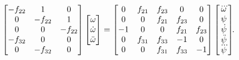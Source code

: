 \documentclass[12pt,a4paper,openany]{extarticle}
\begin{document}
\begin{equation}
\begin{bmatrix}
-f_{22} & 1       & 0\\
0       & -f_{22} & 1\\
0       & 0       & -f_{22}\\
-f_{32} & 0       & 0\\
0       & -f_{32} & 0
\end{bmatrix}
\begin{bmatrix}
\omega \\ \dot\omega \\ \ddot\omega
\end{bmatrix}
=
\begin{bmatrix}
0  & f_{21} & f_{23} & 0      & 0\\
0  & 0      & f_{21} & f_{23} & 0\\
-1 & 0      & 0      & f_{21} & f_{23}\\
0  & f_{31} & f_{33} & -1     & 0\\
0  & 0      & f_{31} & f_{33} & -1
\end{bmatrix}
\begin{bmatrix}
\dddot\omega \\ \psi \\ \dot\psi \\ \ddot\psi \\ \dddot\psi
\end{bmatrix}\!\!\ldotp
\end{equation} 
\end{document}

